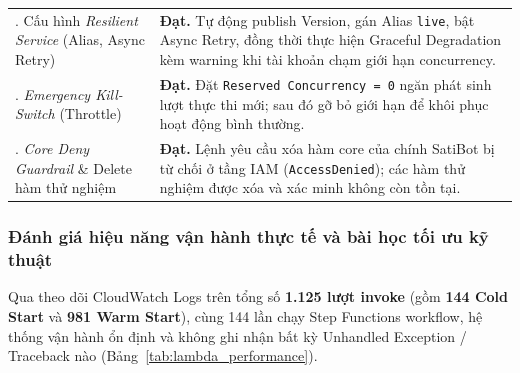 \documentclass[a4paper,12pt]{article}
\newcommand{\code}[1]{\texttt{#1}}
\begin{document}
\begin{longtable}{@{}>{\raggedright\arraybackslash}p{5.1cm}>{\raggedright\arraybackslash}p{\dimexpr\linewidth-5.1cm-2\tabcolsep\relax}@{}}
8. Cấu hình \textit{Resilient Service} (Alias, Async Retry) & \textbf{Đạt.} Tự động publish Version, gán Alias \code{live}, bật Async Retry, đồng thời thực hiện Graceful Degradation kèm warning khi tài khoản chạm giới hạn concurrency.\\
9. \textit{Emergency Kill-Switch} (Throttle) & \textbf{Đạt.} Đặt \code{Reserved Concurrency = 0} ngăn phát sinh lượt thực thi mới; sau đó gỡ bỏ giới hạn để khôi phục hoạt động bình thường.\\
10. \textit{Core Deny Guardrail} \& Delete hàm thử nghiệm & \textbf{Đạt.} Lệnh yêu cầu xóa hàm core của chính SatiBot bị từ chối ở tầng IAM (\code{AccessDenied}); các hàm thử nghiệm được xóa và xác minh không còn tồn tại.\\
\end{longtable}
\endgroup

\subsubsection{Đánh giá hiệu năng vận hành thực tế và bài học tối ưu kỹ thuật}

Qua theo dõi CloudWatch Logs trên tổng số \textbf{1.125 lượt invoke} (gồm \textbf{144 Cold Start} và \textbf{981 Warm Start}), cùng 144 lần chạy Step Functions workflow, hệ thống vận hành ổn định và không ghi nhận bất kỳ Unhandled Exception / Traceback nào (Bảng~\ref{tab:lambda_performance}).
\end{document}
